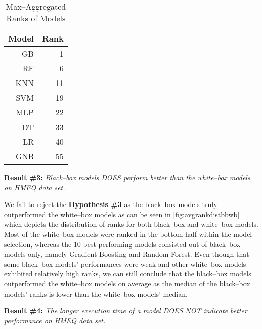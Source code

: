 \begin{table}[H]
    \small
    \setlength{\tabcolsep}{8pt}
    \renewcommand{\arraystretch}{1.3}
    \centering
        \caption[Max--Aggregated Ranks of Models]{Max--Aggregated Ranks of Models}\label{tab:maxranks}
        \begin{tabular}{r r}
    \toprule
    \textbf{Model} & \textbf{Rank}\\
    \midrule
    \hline
    GB & 1 \\ 
    RF & 6 \\ 
    KNN & 11 \\ 
    SVM & 19 \\ 
    MLP & 22 \\ 
    DT & 33 \\ 
    LR & 40 \\
    GNB & 55 \\
    \hline
    \bottomrule
    \end{tabular}
    \vspace{0.35em}

        \vspace{-1em}
\end{table}

\vspace{0.3cm}

\noindent \textbf{Result \#3:} \textit{Black--box models \underline{DOES} perform better than the white--box models on HMEQ data set.}

We fail to reject the \textbf{Hypothesis \#3} as the black--box models truly outperformed the white--box models as can be seen in \autoref{fig:avgrankdistbbwb} which depicts the distribution of ranks for both black--box and white--box models.
Most of the white--box models were ranked in the bottom half within the model selection, whereas the 10 best performing models consisted out of black--box models only, namely Gradient Boosting and Random Forest.
Even though that some black--box models' performances were weak and other white--box models exhibited relatively high ranks, we can still conclude that the black--box models outperformed the white--box models on average as the median of the black--box models' ranks is lower than the white--box models' median.
\vspace{0.3cm}

\noindent \textbf{Result \#4:} \textit{The longer execution time of a model \underline{DOES NOT} indicate better performance on HMEQ data set.}


